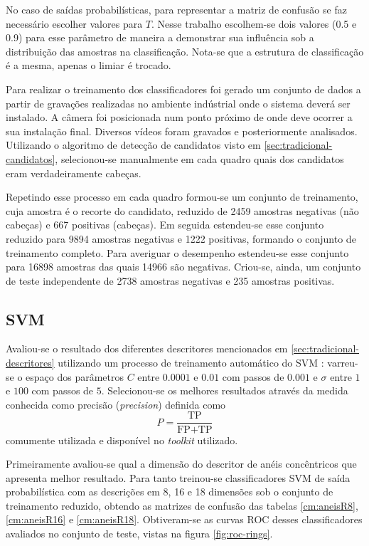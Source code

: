 No caso de saídas probabilísticas, para representar a matriz de confusão se faz necessário escolher valores para $T$. Nesse trabalho escolhem-se dois valores (0.5 e 0.9) para esse parâmetro de maneira a demonstrar sua influência sob a distribuição das amostras na classificação. Nota-se que a estrutura de classificação é a mesma, apenas o limiar é trocado.

Para realizar o treinamento dos classificadores foi gerado um conjunto de dados a partir de gravações realizadas no ambiente indústrial onde o sistema deverá ser instalado. A câmera foi posicionada num ponto próximo de onde deve ocorrer a sua instalação final. Diversos vídeos foram gravados e posteriormente analisados. Utilizando o algoritmo de detecção de candidatos visto em \ref{sec:tradicional-candidatos}, selecionou-se manualmente em cada quadro quais dos candidatos eram verdadeiramente cabeças.

Repetindo esse processo em cada quadro formou-se um conjunto de treinamento, cuja amostra é o recorte do candidato, reduzido de 2459 amostras negativas (não cabeças) e 667 positivas (cabeças). Em seguida estendeu-se esse conjunto reduzido para 9894 amostras negativas e 1222 positivas, formando o conjunto de treinamento completo. Para averiguar o desempenho estendeu-se esse conjunto para 16898 amostras das quais 14966 são negativas. Criou-se, ainda, um conjunto de teste independente de 2738 amostras negativas e 235 amostras positivas.

\subsection{SVM}
Avaliou-se o resultado dos diferentes descritores mencionados em \ref{sec:tradicional-descritores} utilizando um processo de treinamento automático do SVM \cite{scikit-learn}: varreu-se o espaço dos parâmetros $C$ entre $0.0001$ e $0.01$ com passos de $0.001$ e $\sigma$ entre $1$ e $100$ com passos de $5$. Selecionou-se os melhores resultados através da medida conhecida como precisão (\textit{precision}) definida como
\begin{equation}
P = \frac{\text{TP}}{\text{FP}+\text{TP}}
\end{equation}
comumente utilizada e disponível no \textit{toolkit} utilizado.

Primeiramente avaliou-se qual a dimensão do descritor de anéis concêntricos que apresenta melhor resultado. Para tanto treinou-se classificadores SVM de saída probabilística com as descrições em 8, 16 e 18 dimensões sob o conjunto de treinamento reduzido, obtendo as matrizes de confusão das tabelas \ref{cm:aneisR8}, \ref{cm:aneisR16} e \ref{cm:aneisR18}. Obtiveram-se as curvas ROC desses classificadores avaliados no conjunto de teste, vistas na figura \ref{fig:roc-rings}. 


